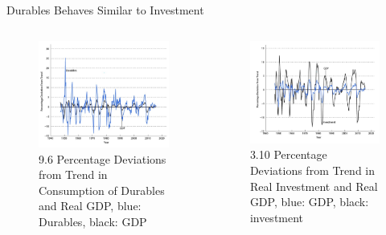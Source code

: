 \documentclass[11pt,aspectratio=169,usenames,dvipsnames]{beamer}
\begin{document}
\begin{frame}{Durables Behaves Similar to Investment}
\label{slide:Durables_Behaves_Similar_to_Investment}
    \begin{columns}
        \begin{column}{0.5\textwidth}
            \begin{figure}
                \caption{\scriptsize 9.6  Percentage Deviations from Trend in Consumption of Durables and Real GDP, \alert{blue: Durables}, black: GDP}
                \includegraphics[width=\textwidth]{./figures/Figure9_6.jpg}
            \end{figure}
        \end{column}
        \begin{column}{0.5\textwidth}
            \begin{figure}
                \caption{\scriptsize 3.10 Percentage Deviations from Trend in \alert{Real Investment} and Real GDP, \alert{blue: GDP}, black: investment}
                \includegraphics[width=\textwidth]{../Lecture_03/figures/Figure3_10.jpg}
            \end{figure}
        \end{column}
    \end{columns}
\end{frame}
\end{document}
